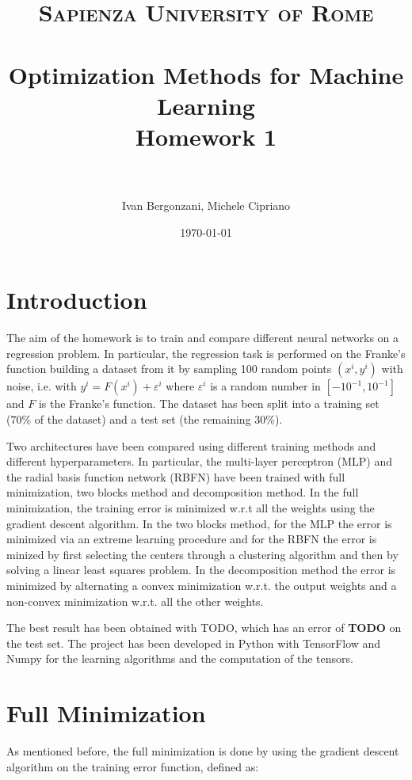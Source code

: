\documentclass[a4paper]{article}
\title{
\normalfont \normalsize
\textsc{Sapienza University of Rome} \\ [25pt] %
\horrule{0.5pt} \\[0.4cm] %
\huge Optimization Methods for Machine Learning \\ %
\large Homework 1 \\
\horrule{2pt} \\[0.5cm] %
}
\author{Ivan Bergonzani, Michele Cipriano} %
\date{\normalsize\today} %
\numberwithin{equation}{section} %
\numberwithin{figure}{section} %
\numberwithin{table}{section} %
\theoremstyle{definition}
\begin{document}
\maketitle %


\section{Introduction}

The aim of the homework is to train and compare different neural networks on a
regression problem. In particular, the regression task is performed on the Franke's
function building a dataset from it by sampling 100 random points $(x^i, y^i)$ with noise,
i.e. with $y^i = F(x^i) + \varepsilon^i$ where $\varepsilon^i$ is a random number in
$[-10^{-1}, 10^{-1}]$ and $F$ is the Franke's function.
The dataset has been split into a training set (70\% of the dataset)
and a test set (the remaining 30\%).

Two architectures have been compared using different training methods and different
hyperparameters. In particular, the multi-layer perceptron (MLP) and the radial basis
function network (RBFN) have been trained with full minimization, two blocks method
and decomposition method. In the full minimization, the training
error is minimized w.r.t all the weights using the gradient descent algorithm.
In the two blocks method, for the MLP
the error is minimized via an extreme learning procedure and for the RBFN the
error is minized by first selecting the centers through a clustering algorithm
and then by solving a linear least squares problem. In the decomposition method
the error is minimized by alternating a convex minimization w.r.t. the output
weights and a non-convex minimization w.r.t. all the other weights.

The best result has been obtained with TODO, which has an error of \textbf{TODO}
on the test set. The project has been developed in Python with TensorFlow and
Numpy for the learning algorithms and the computation of the tensors.


\section{Full Minimization}

As mentioned before, the full minimization is done by using the gradient
descent algorithm on the training error function, defined as:
\end{document}
